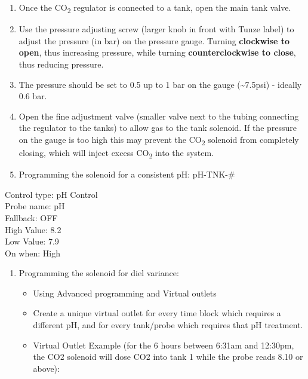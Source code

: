 \documentclass[]{book}
\providecommand{\tightlist}{%
  \setlength{\itemsep}{0pt}\setlength{\parskip}{0pt}}
\begin{document}
\begin{enumerate}
\def\labelenumi{\arabic{enumi}.}
\tightlist
\item
  Once the CO\textsubscript{2} regulator is connected to a tank, open
  the main tank valve.
\item
  Use the pressure adjusting screw (larger knob in front with Tunze
  label) to adjust the pressure (in bar) on the pressure gauge. Turning
  \textbf{clockwise to open}, thus increasing pressure, while turning
  \textbf{counterclockwise to close}, thus reducing pressure.
\item
  The pressure should be set to 0.5 up to 1 bar on the gauge
  (\textasciitilde{}7.5psi) - ideally 0.6 bar.
\item
  Open the fine adjustment valve (smaller valve next to the tubing
  connecting the regulator to the tanks) to allow gas to the tank
  solenoid. If the pressure on the gauge is too high this may prevent
  the CO\textsubscript{2} solenoid from completely closing, which will
  inject excess CO\textsubscript{2} into the system.
\item
  Programming the solenoid for a consistent pH: pH-TNK-\#
\end{enumerate}

Control type: pH Control\\
Probe name: pH\\
Fallback: OFF\\
High Value: 8.2\\
Low Value: 7.9\\
On when: High

\begin{enumerate}
\def\labelenumi{\arabic{enumi}.}
\setcounter{enumi}{5}
\tightlist
\item
  Programming the solenoid for diel variance:

  \begin{itemize}
  \tightlist
  \item
    Using Advanced programming and Virtual outlets
  \item
    Create a unique virtual outlet for every time block which requires a
    different pH, and for every tank/probe which requires that pH
    treatment.
  \item
    Virtual Outlet Example (for the 6 hours between 6:31am and 12:30pm,
    the CO2 solenoid will dose CO2 into tank 1 while the probe reads
    8.10 or above):
  \end{itemize}
\end{enumerate}
\end{document}
